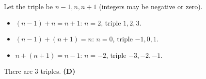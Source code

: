 Let the triple be $n-1,n,n+1$ (integers may be negative or zero).
\begin{itemize}
\item $(n-1)+n=n+1$: $n=2$, triple $1,2,3$.
\item $(n-1)+(n+1)=n$: $n=0$, triple $-1,0,1$.
\item $n+(n+1)=n-1$: $n=-2$, triple $-3,-2,-1$.
\end{itemize}
There are $3$ triples. \textbf{(D)}
